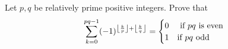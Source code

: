 Let $\displaystyle{p,q}$ be relatively prime positive integers. Prove that
\[\displaystyle{ \sum_{k=0}^{pq-1} (-1)^{\left\lfloor \frac{k}{p}\right\rfloor + \left\lfloor \frac{k}{q}\right\rfloor}  = \begin{cases} 0 & \textnormal{ if } pq  \textnormal{ is even}\\ 1 &  \textnormal{if } pq \textnormal{  odd}\end{cases}}\]


